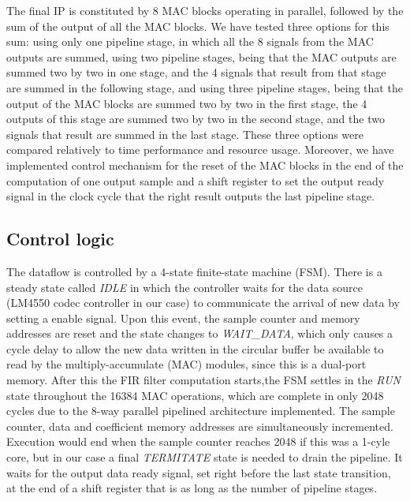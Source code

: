 \documentclass[12pt]{article}
\begin{document}
The final IP is constituted by 8 MAC blocks operating in parallel, followed by the sum of the output
of all the MAC blocks. We have tested three options for this sum: using only one pipeline stage, in
which all the 8 signals from the MAC outputs are summed, using two pipeline stages, being that the
MAC outputs are summed two by two in one stage, and the 4 signals that result from that stage are
summed in the following stage, and using three pipeline stages, being that the output of the MAC
blocks are summed two by two in the first stage, the 4 outputs of this stage are summed two by two
in the second stage, and the two signals that result are summed in the last stage. These three
options were compared relatively to time performance and resource usage. Moreover, we have
implemented control mechanism for the reset of the MAC blocks in the end of the computation of one
output sample and a shift register to set the output ready signal in the clock cycle that the right
result outputs the last pipeline stage.

\subsection{Control logic}

The dataflow is controlled by a 4-state finite-state machine (FSM). There is a steady state called \emph{IDLE} in which the controller waits for the data source (LM4550 codec controller in our case) to  communicate the arrival of new data by setting a enable signal. Upon this event, the sample counter and memory addresses are reset and the state changes to \emph{WAIT\_DATA}, which only causes a cycle delay to allow the new data written in the circular buffer be available to read by the multiply-accumulate (MAC) modules, since this is a dual-port memory. After this the FIR filter computation starts,the FSM settles in the \emph{RUN} state throughout the 16384 MAC operations, which are complete in only 2048 cycles due to the 8-way parallel pipelined architecture implemented. The sample counter, data and coefficient memory addresses are simultaneously incremented. Execution would end when the sample counter reaches 2048 if this was a 1-cyle core, but in our case a final \emph{TERMITATE} state is needed to drain the pipeline. It waits for the output data ready signal, set right before the last state transition, at the end of a shift register that is as long as the number of pipeline stages.
\end{document}
